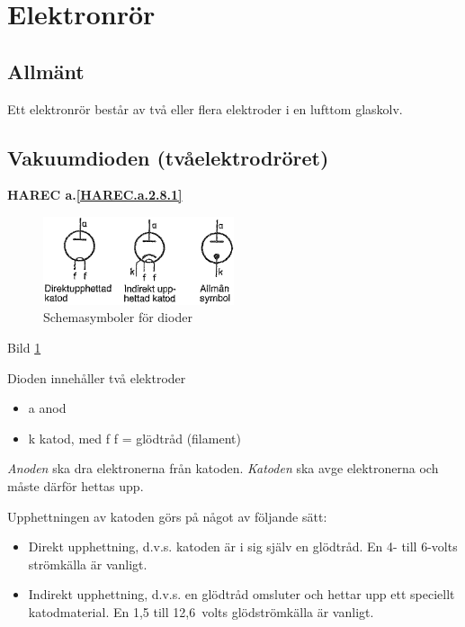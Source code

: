 \section{Elektronrör}
\label{elektronrör}

\subsection{Allmänt}

Ett elektronrör består av två eller flera elektroder i en lufttom glaskolv.

\subsection{Vakuumdioden (tvåelektrodröret)}
\textbf{HAREC a.\ref{HAREC.a.2.8.1}\label{myHAREC.a.2.8.1}}
\label{vakuumdioden}

\begin{figure}
\includegraphics[width=0.5\textwidth]{images/bild_2_2-24.png}
\caption{Schemasymboler för dioder}
\label{fig:BildII2-24}
\end{figure}

Bild \ref{fig:BildII2-24}

Dioden innehåller två elektroder
\begin{itemize}
\item a anod
\item k katod, med f f = glödtråd (filament)
\end{itemize}

\emph{Anoden} ska dra elektronerna från katoden.
\emph{Katoden} ska avge elektronerna och måste därför hettas upp.

Upphettningen av katoden görs på något av följande sätt:
\begin{itemize}
\item Direkt upphettning, d.v.s. katoden är i sig själv en glödtråd. En 4-
  till 6-volts strömkälla är vanligt.
\item Indirekt upphettning, d.v.s. en glödtråd omsluter och hettar upp ett
  speciellt katodmaterial. En 1,5 till 12,6~volts glödströmkälla är vanligt.
\end{itemize}

